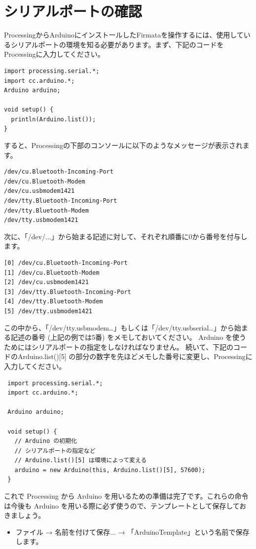 \documentclass[11pt,a4paper]{jarticle}
\begin{document}
\newpage

\section{シリアルポートの確認}
ProcessingからArduinoにインストールしたFirmataを操作するには、使用しているシリアルポートの環境を知る必要があります。まず、下記のコードをProcessingに入力してください。
\begin{lstlisting}
import processing.serial.*;
import cc.arduino.*;
Arduino arduino;
 
void setup() {
  println(Arduino.list());
}
\end{lstlisting}
すると、Processingの下部のコンソールに以下のようなメッセージが表示されます。
\begin{lstlisting}
/dev/cu.Bluetooth-Incoming-Port
/dev/cu.Bluetooth-Modem
/dev/cu.usbmodem1421
/dev/tty.Bluetooth-Incoming-Port
/dev/tty.Bluetooth-Modem
/dev/tty.usbmodem1421
\end{lstlisting}
次に、「/dev/...」から始まる記述に対して、それぞれ順番に0から番号を付与します。
\begin{lstlisting}
[0] /dev/cu.Bluetooth-Incoming-Port
[1] /dev/cu.Bluetooth-Modem
[2] /dev/cu.usbmodem1421
[3] /dev/tty.Bluetooth-Incoming-Port
[4] /dev/tty.Bluetooth-Modem
[5] /dev/tty.usbmodem1421
\end{lstlisting}
この中から、「/dev/tty.usbmodem…」もしくは「/dev/tty.usbserial…」から始まる記述の番号 (上記の例では5番) をメモしておいてください。
Arduino を使うためにはシリアルポートの指定をしなければなりません。
続いて、下記のコードのArduino.list()[5] の部分の数字を先ほどメモした番号に変更し、Processingに入力してください。
\begin{lstlisting}
 import processing.serial.*;
 import cc.arduino.*;

 Arduino arduino;

 void setup() {
   // Arduino の初期化
   // シリアルポートの指定など
   // Arduino.list()[5] は環境によって変える
   arduino = new Arduino(this, Arduino.list()[5], 57600);
 }
\end{lstlisting}

これで Processing から Arduino を用いるための準備は完了です。これらの命令は今後も Arduino を用いる際に必ず使うので、テンプレートとして保存しておきましょう。

\begin{itemize}
\item ファイル → 名前を付けて保存... → 「ArduinoTemplate」という名前で保存します。
\end{itemize}
\end{document}
